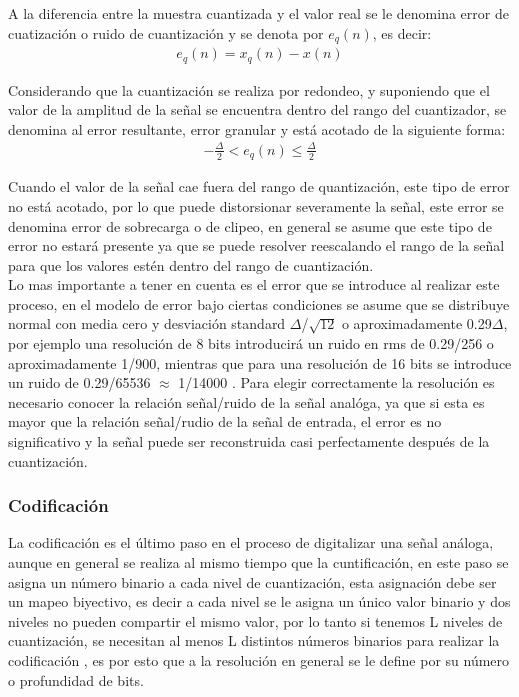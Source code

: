 A la diferencia entre la muestra cuantizada y el valor real se le denomina error de cuatizaci\'on o ruido de cuantizaci\'on y se denota por \begin{math}e_q(n)\end{math}, es decir:
\begin{align}
	e_q(n) = x_q(n) - x(n)
\end{align}

Considerando que la cuantizaci\'on se realiza por redondeo, y suponiendo que el valor de la amplitud de la señal se encuentra dentro del rango del cuantizador, se denomina al error resultante, error granular y est\'a acotado de la siguiente forma:
\begin{align}
	-\frac{\Delta}{2} < e_q(n) \leq \frac{\Delta}{2}
\end{align}

Cuando el valor de la señal cae fuera del rango de quantizaci\'on, este tipo de error no est\'a acotado, por lo que puede distorsionar severamente la señal, este error se denomina error de sobrecarga o de clipeo, en general se asume que este tipo de error no estar\'a presente ya que se puede resolver reescalando el rango de la señal para que los valores est\'en dentro del rango de cuantizaci\'on.\\

Lo mas importante a tener en cuenta es el error que se introduce al realizar este proceso, en el modelo de error bajo ciertas condiciones se asume que se distribuye normal con media cero y desviaci\'on standard $\Delta$/$\sqrt{12}$ o aproximadamente 0.29$\Delta$, por ejemplo una resoluci\'on de 8 bits introducir\'a un ruido en rms de 0.29/256 o aproximadamente 1/900, mientras que para una resoluci\'on de 16 bits se introduce un ruido de 0.29/65536 $\approx$ 1/14000 \cite{smith}. Para elegir correctamente la resoluci\'on es necesario conocer la relaci\'on señal/ruido de la señal anal\'oga, ya que si esta es mayor que la relaci\'on señal/rudio de la señal de entrada, el error es no significativo y la señal puede ser reconstruida casi perfectamente despu\'es de la cuantizaci\'on.\\



\subsubsection{Codificaci\'on}
La codificaci\'on es el \'ultimo paso en el proceso de digitalizar una señal an\'aloga, aunque en general se realiza al mismo tiempo que la cuntificaci\'on, en este paso se asigna un n\'umero binario a cada nivel de cuantizaci\'on, esta asignaci\'on debe ser un mapeo biyectivo, es decir a cada nivel se le asigna un \'unico valor binario y dos niveles no pueden compartir el mismo valor, por lo tanto si tenemos L niveles de cuantizaci\'on, se necesitan al menos L distintos n\'umeros binarios para realizar la codificaci\'on \cite{proakis}, es por esto que a la resoluci\'on en general se le define por su n\'umero o profundidad de bits.\\

